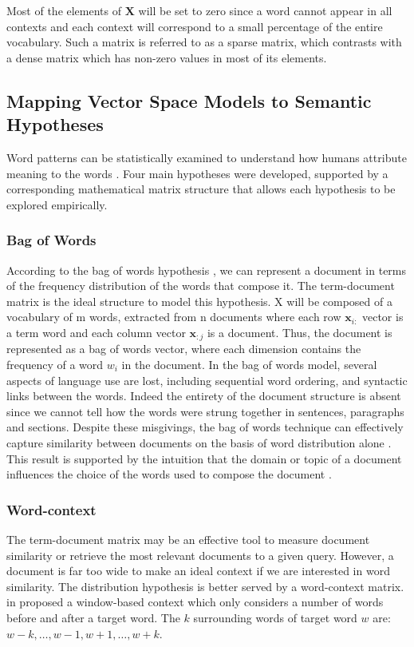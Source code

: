 Most of the elements of $\textbf{X}$ will be set to zero since a word cannot appear in all contexts and each context will correspond to a small percentage of the entire vocabulary.  Such a matrix is referred to as a sparse matrix, which contrasts with a dense matrix which has non-zero values in most of its elements.

\subsection{Mapping Vector Space Models to Semantic Hypotheses}
Word patterns can be statistically examined to understand how humans attribute meaning to the words \citep{turney2010frequency}.  Four main hypotheses were developed, supported by a corresponding mathematical matrix structure that allows each hypothesis to be explored empirically.

\subsubsection{Bag of Words}
According to the bag of words hypothesis \citep{salton1975vector}, we can represent a document in terms of the frequency distribution of the words that compose it.  The term-document matrix is the ideal structure to model this hypothesis.  X will be composed of a vocabulary of m words, extracted from n documents where each row $\textbf{x}_{i:}$ vector is a term word and each column vector $\textbf{x}_{:j}$ is a document.  Thus, the document is represented as a bag of words vector, where each dimension contains the frequency of a word $w_i$ in the document.  In the bag of words model, several aspects of language use are lost, including sequential word ordering, and syntactic links between the words.  Indeed the entirety of the document structure is absent since we cannot tell how the words were strung together in sentences, paragraphs and sections.    Despite these misgivings, the bag of words technique can effectively capture similarity between documents on the basis of word distribution alone \citep{turney2010frequency}.  This result is supported by the intuition that the domain or topic of a document influences the choice of the words used to compose the document \citep{turney2010frequency}.

\subsubsection{Word-context}
The term-document matrix may be an effective tool to measure document similarity or retrieve the most relevant documents to a given query.  However, a document is far too wide to make an ideal context if we are interested in word similarity.  The distribution hypothesis is better served by a word-context matrix.  \citep{lund1996producing} in \citep{turney2010frequency} proposed a window-based context which only considers a number of words before and after a target word.  The $k$ surrounding words of target word $w$ are: $w-k, \ldots, w-1, w+1, \ldots, w+k $.  

